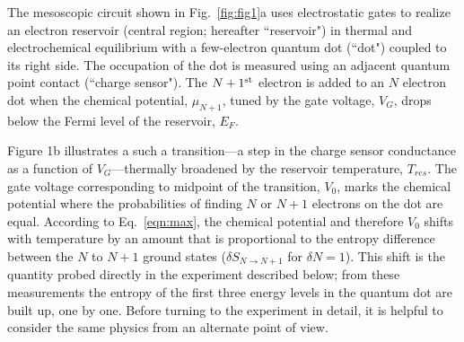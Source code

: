 \documentclass[preprint,showpacs,preprintnumbers,amsmath,amssymb,pra,aps,superscriptaddress]{revtex4-1}
\begin{document}
The mesoscopic circuit shown in Fig.~\ref{fig:fig1}a uses electrostatic gates to realize an electron reservoir (central region; hereafter ``reservoir") in thermal and electrochemical equilibrium with a few-electron quantum dot (``dot") coupled to its right side.  The occupation of the dot is measured using an adjacent quantum point contact (``charge sensor")\cite{Staring2007, Frolov2009, Thierschmann2015}.  The $N+1^{\rm st}$ electron is added to an $N$ electron dot when the chemical potential, $\mu_{N+1}$, tuned by the gate voltage, $V_G$, drops below the Fermi level of the reservoir, $E_F$.  

Figure 1b illustrates a such a transition---a step in the charge sensor conductance as a function of $V_G$---thermally broadened by the reservoir temperature, $T_{res}$.  The gate voltage corresponding to midpoint of the transition, $V_0$, marks the chemical potential where the probabilities of finding $N$ or $N+1$ electrons on the dot are equal.
According to Eq.~\ref{eqn:max}, the chemical potential and therefore $V_0$ shifts with temperature by an amount that is proportional to the entropy difference between the $N$ to $N+1$ ground states ($\delta S_{N\rightarrow N+1}$ for $\delta N=1$).  This shift is the quantity probed directly in the experiment described below; from these measurements the entropy of the first three energy levels in the quantum dot are built up, one by one.  Before turning to the experiment in detail, it is helpful to consider the same physics from an alternate point of view.
  
\end{document}
